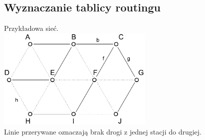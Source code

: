 \documentclass[a4paper,twoside]{article}
\begin{document}
		\subsection{Wyznaczanie tablicy routingu}
			Przykładowa sieć.\\
			\includegraphics[width=7.5cm]{./images/image38.pdf}\\
			Linie przerywane oznaczają brak drogi z jednej stacji do drugiej.
\end{document}
